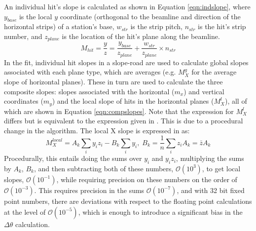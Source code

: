   An individual hit's slope is calculated as shown in Equation \ref{eqn:indslope}, where $y_{base}$ is the local $y$ coordinate (orthogonal to the beamline and direction of the horizontal strips) of a station's base, $w_{str}$ is the strip pitch, $n_{str}$ is the hit's strip number, and $z_{plane}$ is the location of the hit's plane along the beamline.
\begin{equation}
\label{eqn:indslope}
M_{hit}=\frac{y}{z}=\frac{y_{base}}{z_{plane}}+\frac{w_{str}}{z_{plane}}\times n_{str}
\end{equation}
  In the fit, individual hit slopes in a slope-road are used to calculate global slopes associated with each plane type, which are averages (e.g. $M_X^g$ for the average slope of horizontal planes).  These in turn are used to calculate the three composite slopes: slopes associated with the horizontal ($m_x$) and vertical coordinates ($m_y$) and the local slope of hits in the horizontal planes ($M_X^{l}$), all of which are shown in Equation \ref{eqn:compslopes}.  Note that the expression for $M_X^{l}$ differs but is equivalent to the expression given in \cite{blcnote}.  This is due to a procedural change in the algorithm.  The local X slope is expressed  in \cite{blcnote} as:
\begin{equation}
M_X^{local}=A_k\sum_iy_iz_i-B_k\sum_iy_i,\;B_k=\frac{1}{n}\sum_iz_i A_k=\bar{z}A_k
\end{equation}
Procedurally, this entails doing the sums over $y_i$ and $y_iz_i$, multiplying the sums by $A_k$, $B_k$, and then subtracting both of these numbers, $\mathcal{O}\left(10^3\right)$, to get local slopes, $\mathcal{O}\left(10^{-1}\right)$, while requiring precision on these numbers on the order of  $\mathcal{O}\left(10^{-3}\right)$.  This requires precision in the sums $\mathcal{O}\left(10^{-7}\right)$, and with 32 bit fixed point numbers, there are deviations with respect to the floating point calculations at the level of $\mathcal{O}\left(10^{-5}\right)$, which is enough to introduce a significant bias in the $\Delta\theta$ calculation.

